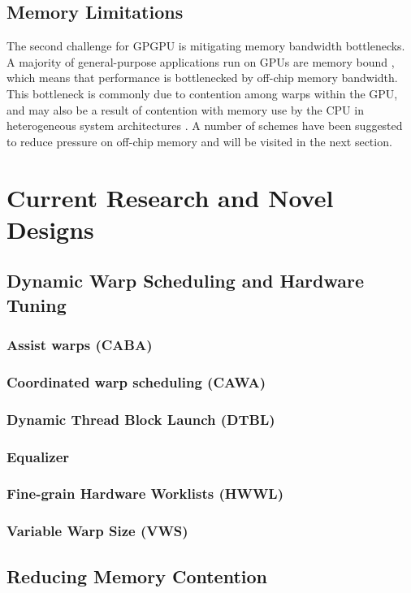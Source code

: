 \documentclass[prodmode,acmtecs]{acmsmall} %
\begin{document}
\subsection{Memory Limitations}
The second challenge for GPGPU is mitigating memory bandwidth bottlenecks. A
majority of general-purpose applications run on GPUs are memory bound
\cite{AssistWarps}, which means that performance is bottlenecked by off-chip
memory bandwidth. This bottleneck is commonly due to contention among warps
within the GPU, and may also be a result of contention with memory use by the
CPU in heterogeneous system architectures
\cite{ManagingConcurrencyInHeterogeneous}. A number of schemes have been
suggested to reduce pressure on off-chip memory and will be visited in the next
section.

\section{Current Research and Novel Designs} \label{sec:research}
\subsection{Dynamic Warp Scheduling and Hardware Tuning}
\subsubsection{Assist warps (CABA)}
\subsubsection{Coordinated warp scheduling (CAWA)}
\subsubsection{Dynamic Thread Block Launch (DTBL)}
\subsubsection{Equalizer}
\subsubsection{Fine-grain Hardware Worklists (HWWL)}
\subsubsection{Variable Warp Size (VWS)}
\subsection{Reducing Memory Contention}
\end{document}
